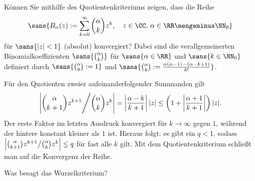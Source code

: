 \begin{frage}\label{02_quota}
  Können Sie mithilfe des Quotientenkriteriums zeigen, dass die 
  Reihe 
  \[
  \sans{
    B_\alpha ( z ) : = \sum_{k=0}^\infty \binom{\alpha}{k} z^k, \quad 
    z \in \CC, \, \alpha\in \RR \mengeminus \NN_0
  }
  \]
  für $\sans{|z|<1}$ (absolut) konvergiert?
  Dabei sind die verallgemeinerten Binomialkoeffizienten 
  $\sans{\binom{\alpha}{k}}$ 
  für $\sans{\alpha\in\RR}$ und $\sans{k\in\NN_0}$ definiert 
  durch $\sans{\binom{\alpha}{0} := 1}$ und 
  $\sans{\binom{\alpha }{k}:= \frac{\alpha(\alpha-1)\cdots (\alpha-k+1)}{k!}}$.
\end{frage}

\begin{antwort}
  Für den Quotienten zweier aufeinanderfolgender Summanden gilt
  \[
  \left| \binom{\alpha}{k+1}z^{k+1} \Bigg{/} \binom{\alpha}{k} z^{k} \right| 
  =\left| \frac{\alpha-k}{k+1} \right| |z| 
  \le \left( 1+ \left| \frac{\alpha+1}{k+1} \right| \right) 
  |z|.
  \]
  Der erste Faktor im letzten Ausdruck konvergiert 
  für $k\to\infty$ gegen $1$, während der 
  hintere konstant kleiner als $1$ ist. 
  Hieraus folgt: es gibt ein $q<1$, sodass  
  $\left| \binom{\alpha}{k+1}z^{k+1} \big{/} \binom{\alpha}{k} z^k \right|\le q$ 
  für fast alle $k$ gilt. Mit dem Quotientenkriterium 
  schließt man auf die Konvergenz der Reihe.
  \AntEnd 
\end{antwort}

\begin{frage}\label{02_wurz}
  Was besagt das Wurzelkriterium? 
\end{frage}

